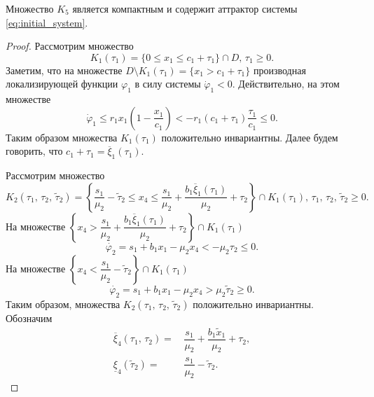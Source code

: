 \documentclass[14pt,a4paper]{extarticle}
\begin{document}
	\begin{theorem}
		Множество $K_5$ является компактным и содержит аттрактор системы \ref{eq:initial_system}.
	\end{theorem}
	\begin{proof}
		Рассмотрим множество
		\[K_1(\tau_1) = \{0 \leqslant x_1 \leqslant c_1+\tau_1\}\cap D,\, \tau_1\geqslant0.\]
		Заметим, что на множестве $D\setminus K_1(\tau_1) = \{x_1>c_1+\tau_1\}$ производная локализирующей функции $\varphi_1$ в силу системы $\dot{\varphi}_1 < 0$. Действительно, на этом множестве 
		\[\dot{\varphi}_1 \leqslant r_1x_1\left(1-\dfrac{x_1}{c_1}\right) < -r_1(c_1+\tau_1)\dfrac{\tau_1}{c_1} \leqslant 0.\]
		Таким образом множества $K_1(\tau_1)$ положительно инвариантны. Далее будем говорить, что $c_1+\tau_1=\overline{\xi}_1(\tau_1)$.
		
		Рассмотрим множество 
		\[K_2(\tau_1,\,\tau_2,\, \tilde{\tau}_2)=\left\{\dfrac{s_1}{\mu_2}-\tilde{\tau}_2 \leqslant x_4 \leqslant \dfrac{s_1}{\mu_2} + \dfrac{b_1\overline{\xi}_1(\tau_1)}{\mu_2} + \tau_2\right\}\cap K_1(\tau_1),\,\tau_1,\,\tau_2,\,\tilde{\tau}_2 \geqslant 0.\]   
		На множестве $\left\{x_4 > \dfrac{s_1}{\mu_2} + \dfrac{b_1\overline{\xi}_1(\tau_1)}{\mu_2} + \tau_2\right\}\cap K_1(\tau_1)$
		\[\dot{\varphi_2} = s_1 + b_1x_1 - \mu_2x_4 < - \mu_2\tau_2 \leqslant 0.\]
		На множестве $\left\{x_4 < \dfrac{s_1}{\mu_2}-\tilde{\tau}_2\right\}\cap K_1(\tau_1)$
		\[\dot{\varphi_2} = s_1 + b_1x_1 - \mu_2x_4 > \mu_2\tilde{\tau}_2 \geqslant 0.\]
		Таким образом, множества $K_2(\tau_1,\,\tau_2,\,\tilde{\tau}_2)$ положительно инвариантны. Обозначим
		\begin{align*}
			\overline{\xi}_4(\tau_1,\,\tau_2) =&\, \dfrac{s_1}{\mu_2} + \dfrac{b_1\tilde{x}_1}{\mu_2} + \tau_2,\\
			\underline{\xi}_4(\tilde{\tau}_2) =&\, \dfrac{s_1}{\mu_2} - \tilde{\tau}_2.
		\end{align*}
		

\end{proof}
\end{document}
